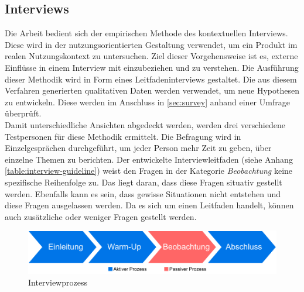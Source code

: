 \subsection{Interviews}\label{sec:interview}
Die Arbeit bedient sich der empirischen Methode des kontextuellen Interviews\cite{contextual-design}.
Diese wird in der nutzungsorientierten Gestaltung verwendet, um ein Produkt im realen Nutzungskontext zu untersuchen. 
Ziel dieser Vorgehensweise ist es, externe Einflüsse in einem Interview mit einzubeziehen und zu verstehen. 
Die Ausführung dieser Methodik wird in Form eines Leitfadeninterviews\cite[S.559 ff.]{handbuch-methoden-der-empirischen-sozialforschung}\cite[S. 121 ff.]{methoden-in-der-naturwissenschaft} gestaltet. Die aus diesem Verfahren generierten qualitativen Daten werden verwendet, um neue Hypothesen zu entwickeln. Diese werden im Anschluss in \autoref{sec:survey} anhand einer Umfrage überprüft.\\

Damit unterschiedliche Ansichten abgedeckt werden, werden drei verschiedene Testpersonen für diese Methodik ermittelt. Die Befragung wird in Einzelgesprächen durchgeführt, um jeder Person mehr Zeit zu geben, über einzelne Themen zu berichten\cite[S.95]{game-research-methods}. 
Der entwickelte Interviewleitfaden (siehe Anhang \autoref{table:interview-guideline}) weist den Fragen in der Kategorie \textit{Beobachtung} keine spezifische Reihenfolge zu. Das liegt daran, dass diese Fragen situativ gestellt werden. Ebenfalls kann es sein, dass gewisse Situationen nicht entstehen und diese Fragen ausgelassen werden. Da es sich um einen Leitfaden handelt, können auch zusätzliche oder weniger Fragen gestellt werden.\\

\begin{figure}[ht]
\begin{center}
\includegraphics[width=1\columnwidth]{figures/interview-workflow.pdf}
  \caption{\label{fig:interview-workflow} Interviewprozess}
\end{center}
\end{figure}

